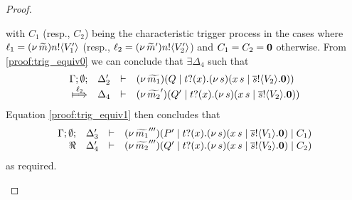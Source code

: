 \begin{proof}
\begin{enumerate}
				with $C_1$ (resp., $C_2$) being the characteristic trigger process
				in the cases where $\ell_1 = (\nu\, \widetilde{m}) n ! \langle V_1' \rangle$ (resp., $\ell_2 = (\nu\, \widetilde{m}') n ! \langle V_2' \rangle$)
				and $C_1 = C_2 = \mathbf{0}$ otherwise.
				From \eqref{proof:trig_equiv0} we can conclude that $\exists \Delta_4$ such that
			\[
				\mhorel{\Gamma}{\Delta_2'}{\newsp{\widetilde{m_1}}{Q \Par \hotrigger{t}{x}{s}{V_2}}}
				{\Hby{\ell_2}}
				{\Delta_4}{}{\newsp{\widetilde{m_2}'}{Q' \Par \hotrigger{t}{x}{s}{V_2}}}
			\]
				Equation \eqref{proof:trig_equiv1} then concludes that
			\[
				\begin{array}{rcll} \Gamma; \emptyset; &\Delta_3'& \vdash& (\nu\, \widetilde{m_1}''')(P' \;|\; t ? (x) . (\nu\, s)(x\, {s} \;|\; \overline{s} ! \langle V_1 \rangle . \mathbf{0}) \;|\; C_1)\\ \Re &\Delta_4'& \vdash &  (\nu\, \widetilde{m_2}''')(Q' \;|\; t ? (x) . (\nu\, s)(x\, {s} \;|\; \overline{s} ! \langle V_2 \rangle . \mathbf{0}) \;|\; C_2) \end{array}
			\]
				as required.


\end{enumerate}
\end{proof}
